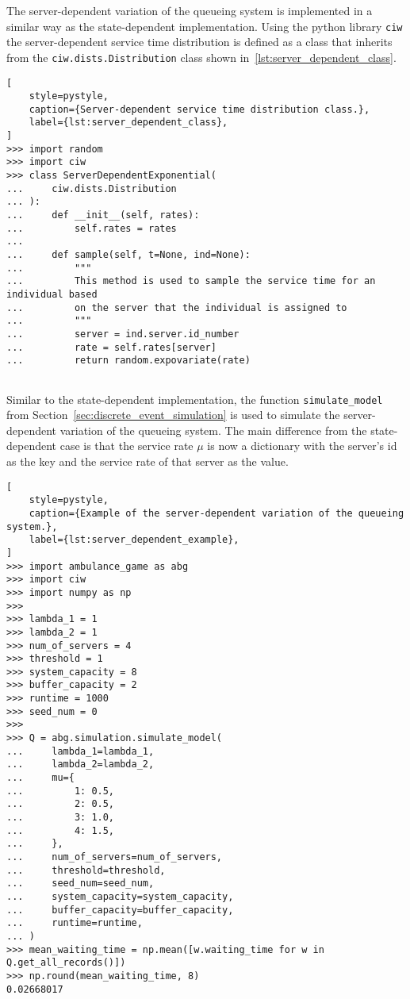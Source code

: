 The server-dependent variation of the queueing system is implemented in a
similar way as the state-dependent implementation.
Using the python library \texttt{ciw} the server-dependent service time
distribution is defined as a class that inherits from the
\texttt{ciw.dists.Distribution} class shown in~\ref{lst:server_dependent_class}.

\begin{lstlisting}[
    style=pystyle,
    caption={Server-dependent service time distribution class.},
    label={lst:server_dependent_class},
]
>>> import random
>>> import ciw
>>> class ServerDependentExponential(
...     ciw.dists.Distribution
... ):
...     def __init__(self, rates):
...         self.rates = rates
... 
...     def sample(self, t=None, ind=None):
...         """
...         This method is used to sample the service time for an individual based
...         on the server that the individual is assigned to
...         """
...         server = ind.server.id_number
...         rate = self.rates[server]
...         return random.expovariate(rate)
    
\end{lstlisting}

Similar to the state-dependent implementation, the function
\texttt{simulate\_model} from Section~\ref{sec:discrete_event_simulation} is
used to simulate the server-dependent variation of the queueing system.
The main difference from the state-dependent case is that the service rate
\(\mu\) is now a dictionary with the server's id as the key and the service
rate of that server as the value.

\begin{lstlisting}[
    style=pystyle,
    caption={Example of the server-dependent variation of the queueing system.},
    label={lst:server_dependent_example},
]
>>> import ambulance_game as abg
>>> import ciw
>>> import numpy as np
>>>
>>> lambda_1 = 1
>>> lambda_2 = 1
>>> num_of_servers = 4
>>> threshold = 1
>>> system_capacity = 8
>>> buffer_capacity = 2
>>> runtime = 1000
>>> seed_num = 0
>>>
>>> Q = abg.simulation.simulate_model(
...     lambda_1=lambda_1,
...     lambda_2=lambda_2,
...     mu={
...         1: 0.5,
...         2: 0.5,
...         3: 1.0,
...         4: 1.5,
...     },
...     num_of_servers=num_of_servers,
...     threshold=threshold,
...     seed_num=seed_num,
...     system_capacity=system_capacity,
...     buffer_capacity=buffer_capacity,
...     runtime=runtime,
... )
>>> mean_waiting_time = np.mean([w.waiting_time for w in Q.get_all_records()])
>>> np.round(mean_waiting_time, 8)
0.02668017

\end{lstlisting}

